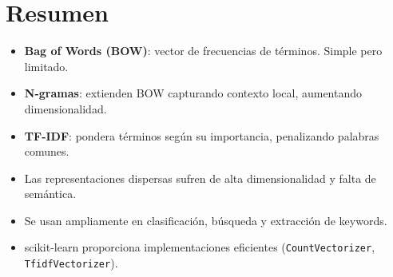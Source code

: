\documentclass[12pt,a4paper,openany,oneside]{book}
\begin{document}
\section{Resumen}
\begin{itemize}
    \item \textbf{Bag of Words (BOW)}: vector de frecuencias de términos. Simple pero limitado.
    \item \textbf{N-gramas}: extienden BOW capturando contexto local, aumentando dimensionalidad.
    \item \textbf{TF-IDF}: pondera términos según su importancia, penalizando palabras comunes.
    \item Las representaciones dispersas sufren de alta dimensionalidad y falta de semántica.
    \item Se usan ampliamente en clasificación, búsqueda y extracción de keywords.
    \item scikit-learn proporciona implementaciones eficientes (\texttt{CountVectorizer}, \texttt{TfidfVectorizer}).
\end{itemize}
\end{document}

